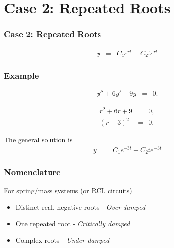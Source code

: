 \section{Case 2: Repeated Roots}

\begin{frame}
  \frametitle{Case 2: Repeated Roots}

  \begin{eqnarray*}
    y & = & C_1 e^{rt} + C_2 t e^{rt}
  \end{eqnarray*}


\end{frame}


\begin{frame}
  \frametitle{Example}

  \begin{eqnarray*}
    y'' + 6y' + 9y & = & 0.
  \end{eqnarray*}

  {
    \begin{eqnarray*}
      r^2 + 6r + 9 & = & 0, \\
      (r+3)^2 & = & 0.
    \end{eqnarray*}

    The general solution is
    \begin{eqnarray*}
      y & = & C_1 e^{-3t} + C_2 t e^{-3t}
    \end{eqnarray*}

  }

\end{frame}


\begin{frame}
  \frametitle{Nomenclature}

  For spring/mass systems (or RCL circuits)
  \begin{itemize}
  \item Distinct real, negative roots - \textit{Over damped}
  \item One repeated root - \textit{Critically damped}
  \item Complex roots   - \textit{Under damped}
  \end{itemize}

\end{frame}

